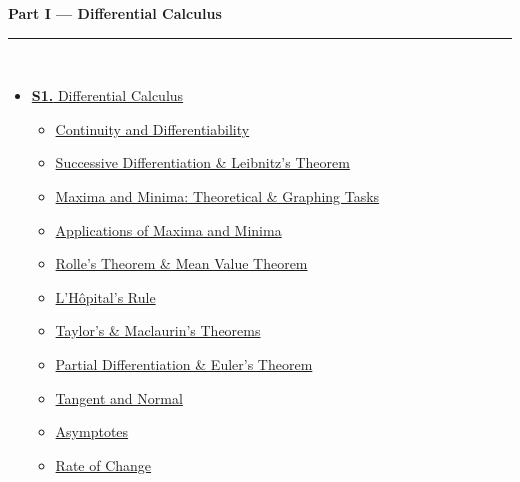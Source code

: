 \documentclass[12pt,a3paper]{article}
\begin{document}
\begin{tcolorbox}[breakable,colback=cA!5,colframe=cA,boxrule=1pt,arc=5pt,
  left=8pt,right=8pt,top=8pt,bottom=8pt,before skip=4pt]
  {\large\bfseries\textcolor{cA}{Part I --- Differential Calculus}}\\[5pt]
  \textcolor{cA!40}{\rule{\textwidth}{0.4pt}}\\[3pt]
  \small\begin{itemize}[leftmargin=1.2em,itemsep=1pt,label={\textcolor{cA}{$\triangleright$}}]
    \item \hyperref[sec:S1]{\textbf{S1.} Differential Calculus}
      \begin{itemize}[leftmargin=1.5em,itemsep=0pt,label={\textcolor{cA}{$\cdot$}}]
        \item \hyperref[sub:s1-cont]{Continuity and Differentiability}
        \item \hyperref[sub:s1-succ]{Successive Differentiation \& Leibnitz's Theorem}
        \item \hyperref[sub:s1-maxmin-theory]{Maxima and Minima: Theoretical \& Graphing Tasks}
        \item \hyperref[sub:s1-maxmin-apps]{Applications of Maxima and Minima}
        \item \hyperref[sub:s1-rolle]{Rolle's Theorem \& Mean Value Theorem}
        \item \hyperref[sub:s1-lhospital]{L'H\^{o}pital's Rule}
        \item \hyperref[sub:s1-taylor]{Taylor's \& Maclaurin's Theorems}
        \item \hyperref[sub:s1-partial]{Partial Differentiation \& Euler's Theorem}
        \item \hyperref[sub:s1-tangnorm]{Tangent and Normal}
        \item \hyperref[sub:s1-asymptotes]{Asymptotes}
        \item \hyperref[sub:s1-rateofchange]{Rate of Change}
      \end{itemize}
  \end{itemize}
\end{tcolorbox}

\vspace{6pt}
\end{document}
